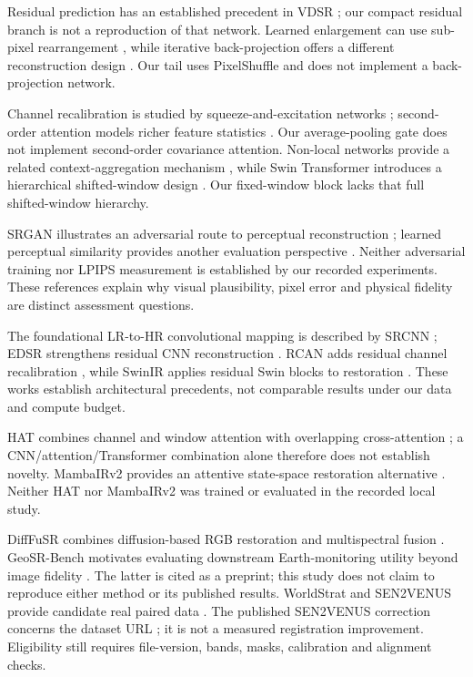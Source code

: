 Residual prediction has an established precedent in VDSR \cite{Kim_2016_CVPR}; our compact residual branch is not a reproduction of that network. Learned enlargement can use sub-pixel rearrangement \cite{Shi_2016_CVPR}, while iterative back-projection offers a different reconstruction design \cite{Haris_2018_CVPR}. Our tail uses PixelShuffle and does not implement a back-projection network.

Channel recalibration is studied by squeeze-and-excitation networks \cite{Hu_2018_CVPR}; second-order attention models richer feature statistics \cite{Dai_2019_CVPR}. Our average-pooling gate does not implement second-order covariance attention. Non-local networks provide a related context-aggregation mechanism \cite{Wang_2018_CVPR}, while Swin Transformer introduces a hierarchical shifted-window design \cite{Liu_2021_ICCV}. Our fixed-window block lacks that full shifted-window hierarchy.

SRGAN illustrates an adversarial route to perceptual reconstruction \cite{Ledig_2017_CVPR}; learned perceptual similarity provides another evaluation perspective \cite{Zhang_2018_CVPR}. Neither adversarial training nor LPIPS measurement is established by our recorded experiments. These references explain why visual plausibility, pixel error and physical fidelity are distinct assessment questions.

The foundational LR-to-HR convolutional mapping is described by SRCNN \cite{dong2014srcnn}; EDSR strengthens residual CNN reconstruction \cite{lim2017edsr}. RCAN adds residual channel recalibration \cite{zhang2018rcan}, while SwinIR applies residual Swin blocks to restoration \cite{liang2021swinir}. These works establish architectural precedents, not comparable results under our data and compute budget.

HAT combines channel and window attention with overlapping cross-attention \cite{chen2023hat}; a CNN/attention/Transformer combination alone therefore does not establish novelty. MambaIRv2 provides an attentive state-space restoration alternative \cite{guo2025mambairv2}. Neither HAT nor MambaIRv2 was trained or evaluated in the recorded local study.

DiffFuSR combines diffusion-based RGB restoration and multispectral fusion \cite{sarmad2025difffusr}. GeoSR-Bench motivates evaluating downstream Earth-monitoring utility beyond image fidelity \cite{li2026geosr}. The latter is cited as a preprint; this study does not claim to reproduce either method or its published results. WorldStrat and SEN2VENUS provide candidate real paired data \cite{cornebise2022worldstrat,michel2022sen2venus}. The published SEN2VENUS correction concerns the dataset URL \cite{michel2023correction}; it is not a measured registration improvement. Eligibility still requires file-version, bands, masks, calibration and alignment checks.

